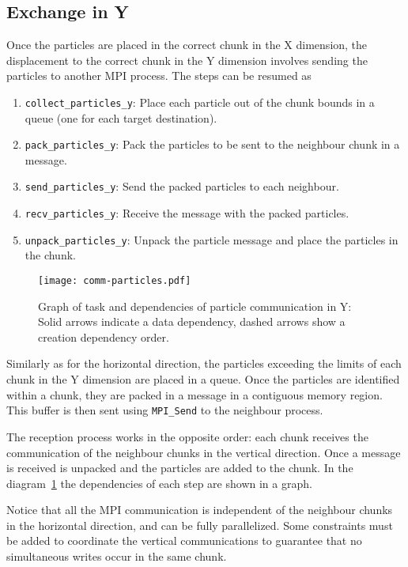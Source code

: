 \subsection{Exchange in Y}
Once the particles are placed in the correct chunk in the X dimension, the 
displacement to the correct chunk in the Y dimension involves sending the 
particles to another MPI process. The steps can be resumed as
%
\begin{enumerate}
\item \texttt{collect\_particles\_y}: Place each particle out of the chunk 
bounds in a queue (one for each target destination).
\item \texttt{pack\_particles\_y}: Pack the particles to be sent to the 
neighbour chunk in a message.
\item \texttt{send\_particles\_y}: Send the packed particles to each neighbour.
\item \texttt{recv\_particles\_y}: Receive the message with the packed 
particles.
\item \texttt{unpack\_particles\_y}: Unpack the particle message and place the 
particles in the chunk.
\end{enumerate}
%
\begin{figure}
\centering
\texttt{[image: comm-particles.pdf]}
\caption{Graph of task and dependencies of particle communication in Y: Solid 
arrows indicate a data dependency, dashed arrows show a creation dependency 
order.}
\label{fig:comm_y}
\end{figure}
%
Similarly as for the horizontal direction, the particles exceeding the limits of 
each chunk in the Y dimension are placed in a queue.  Once the particles are 
identified within a chunk, they are packed in a message in a contiguous memory 
region. This buffer is then sent using \texttt{MPI\_Send} to the neighbour 
process.

The reception process works in the opposite order: each chunk receives the 
communication of the neighbour chunks in the vertical direction. Once a message 
is received is unpacked and the particles are added to the chunk. In the 
diagram~\ref{fig:comm_y} the dependencies of each step are shown in a graph.

Notice that all the MPI communication is independent of the neighbour chunks in 
the horizontal direction, and can be fully parallelized. Some constraints must 
be added to coordinate the vertical communications to guarantee that no 
simultaneous writes occur in the same chunk.


